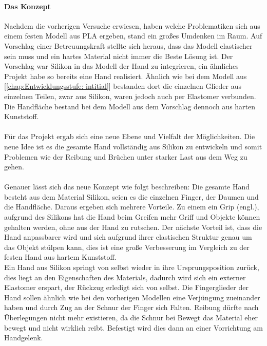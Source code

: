 \documentclass[titlepage,12pt,twoside]{article}
\begin{document}
\paragraph{Das Konzept}
\hfill \break
\hfill \break
Nachdem die vorherigen Versuche erwiesen, haben welche Problematiken sich aus einem festen Modell aus PLA ergeben, stand ein großes Umdenken im Raum. Auf Vorschlag einer Betreuungskraft stellte sich heraus, dass das Modell elastischer sein muss und 
ein hartes Material nicht immer die Beste Lösung ist. Der Vorschlag war Silikon in das Modell der Hand zu integrieren, ein ähnliches Projekt habe so bereits eine Hand realisiert. Ähnlich wie bei dem Modell aus [\textcolor{blue}{\autoref{chap:Entwicklungsstufe: intitial}}] bestanden 
dort die einzelnen Glieder aus einzelnen Teilen, zwar aus Silikon, waren jedoch auch per Elastomer verbunden. Die Handfläche bestand bei dem Modell aus dem Vorschlag dennoch aus harten Kunststoff. \\
\\
Für das Projekt  ergab sich eine neue Ebene und Vielfalt der Möglichkeiten. Die neue Idee ist es die gesamte Hand vollständig aus Silikon zu entwickeln und somit Problemen wie der Reibung und Brüchen unter starker Last aus dem 
Weg zu gehen. \\
\\
Genauer lässt sich das neue Konzept wie folgt beschreiben: Die gesamte Hand besteht aus dem Material Silikon, seien es die einzelnen Finger, der Daumen und die Handfläche. Daraus ergeben sich mehrere Vorteile. Zu einem ein Grip (engl.), aufgrund des 
Silikons hat die Hand beim Greifen mehr Griff und Objekte können gehalten werden, ohne aus der Hand zu rutschen. Der nächste Vorteil ist, dass die Hand anpassbarer wird und sich aufgrund ihrer elastischen Struktur genau um das Objekt stülpen kann, 
dies ist eine große Verbesserung im Vergleich zu der festen Hand aus hartem Kunststoff. \\
Ein Hand aus Silikon springt von selbst wieder in ihre Ursprungsposition zurück, dies liegt an den Eigenschaften des Materials, dadurch wird sich ein externer Elastomer erspart, der Rückzug erledigt sich von selbst. Die Fingerglieder der Hand sollen 
ähnlich wie bei den vorherigen Modellen eine Verjüngung zueinander haben und durch Zug an der Schnur der Finger sich Falten. Reibung dürfte nach Überlegungen nicht mehr existieren, da die Schnur bei Bewegt das Material eher bewegt und nicht wirklich 
reibt. Befestigt wird dies dann an einer Vorrichtung am Handgelenk. \\
\\
\end{document}
